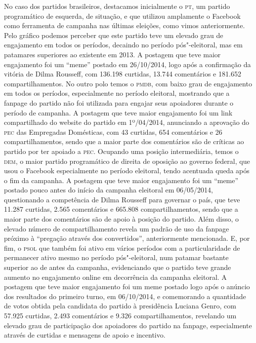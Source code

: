 No caso dos partidos brasileiros, destacamos inicialmente o \textsc{pt}, um
partido programático de esquerda, de situação, e que utilizou amplamente
o Facebook como ferramenta de campanha nas últimas eleições, como vimos
anteriormente. Pelo gráfico podemos perceber que este partido teve um
elevado grau de engajamento em todos os períodos, decaindo no período
pós"-eleitoral, mas em patamares superiores ao existente em 2013. A
postagem que teve maior engajamento foi um ``meme'' postado em
26/10/2014, logo após a confirmação da vitória de Dilma Rousseff, com
136.198 curtidas, 13.744 comentários e 181.652 compartilhamentos. No
outro polo temos o \textsc{pmdb}, com baixo grau de engajamento em todos os
períodos, especialmente no período eleitoral, mostrando que a fanpage do
partido não foi utilizada para engajar seus apoiadores durante o período
de campanha. A postagem que teve maior engajamento foi um link
compartilhado do website do partido em 1º/04/2014, anunciando a
aprovação do \textsc{pec} das Empregadas Domésticas, com 43 curtidas, 654
comentários e 26 compartilhamentos, sendo que a maior parte dos
comentários são de críticas ao partido por ter apoiado a \textsc{pec}. Ocupando
uma posição intermediária, temos o \textsc{dem}, o maior partido programático de
direita de oposição ao governo federal, que usou o Facebook
especialmente no período eleitoral, tendo acentuada queda após o fim da
campanha. A postagem que teve maior engajamento foi um ``meme'' postado
pouco antes do início da campanha eleitoral em 06/05/2014, questionando
a competência de Dilma Rousseff para governar o país, que teve 11.287
curtidas, 2.565 comentários e 665.808 compartilhamentos, sendo que a
maior parte dos comentários são de apoio à posição do partido. Além
disso, o elevado número de compartilhamento revela um padrão de uso da
fanpage próximo à ``pregação através dos convertidos'', anteriormente
mencionada. E, por fim, o \textsc{psol} que também foi ativo em vários períodos
com a particularidade de permanecer ativo mesmo no período
pós"-eleitoral, num patamar bastante superior ao de antes da campanha,
evidenciando que o partido teve grande aumento no engajamento online em
decorrência da campanha eleitoral. A postagem que teve maior engajamento
foi um meme postado logo após o anúncio dos resultados do primeiro
turno, em 06/10/2014, e comemorando a quantidade de votos obtida pela
candidata do partido à presidência Luciana Genro, com 57.925 curtidas,
2.493 comentários e 9.326 compartilhamentos, revelando um
elevado grau de participação dos apoiadores do partido na fanpage,
especialmente através de curtidas e mensagens de apoio e incentivo.

